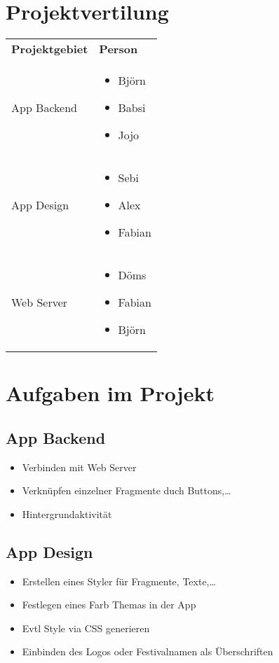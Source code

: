 \documentclass[a4paper,12pt,
headsepline,           %
oneside,               %
pointlessnumbers,      %
bibtotoc,              %
BCOR15mm               %
]{scrbook}
\begin{document}
  \section*{Projektvertilung}
  \begin{tabular}{@{}lP{6cm}@{}} 
      \textbf{Projektgebiet} & \textbf{Person} \\[5pt]
      App Backend &
        \begin{itemize}
          \item Björn 
          \item Babsi
          \item Jojo
        \end{itemize}\\

      App Design &
      \begin{itemize}
          \item Sebi
          \item Alex
          \item Fabian
      \end{itemize}\\

      Web Server &
      \begin{itemize}
          \item Döms
          \item Fabian
          \item Björn
      \end{itemize}\\
  \end{tabular}

  \section*{Aufgaben im Projekt}
  \subsection*{App Backend}
  \begin{itemize}
      \item Verbinden mit Web Server
      \item Verknüpfen einzelner Fragmente duch Buttons,\dots
      \item Hintergrundaktivität
  \end{itemize}

  \subsection*{App Design}
  \begin{itemize}
      \item Erstellen eines Styler für Fragmente, Texte,\dots
      \item Festlegen eines Farb Themas in der App
      \item Evtl Style via CSS generieren
      \item Einbinden des Logos oder Festivalnamen als Überschriften
  \end{itemize}
\end{document}
